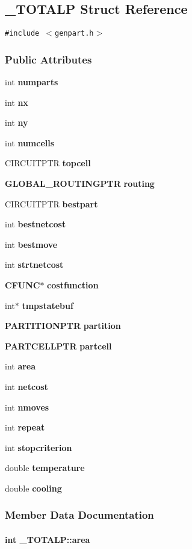 \subsection{\_\-TOTALP  Struct Reference}
\label{_TOTALP}
{\tt \#include $<$genpart.h$>$}

\subsubsection*{Public Attributes}
\begin{CompactItemize}
\item 
int {\bf numparts}
\item 
int {\bf nx}
\item 
int {\bf ny}
\item 
int {\bf numcells}
\item 
CIRCUITPTR {\bf topcell}
\item 
{\bf GLOBAL\_\-ROUTINGPTR} {\bf routing}
\item 
CIRCUITPTR {\bf bestpart}
\item 
int {\bf bestnetcost}
\item 
int {\bf bestmove}
\item 
int {\bf strtnetcost}
\item 
{\bf CFUNC}$\ast$ {\bf costfunction}
\item 
int$\ast$ {\bf tmpstatebuf}
\item 
{\bf PARTITIONPTR} {\bf partition}
\item 
{\bf PARTCELLPTR} {\bf partcell}
\item 
int {\bf area}
\item 
int {\bf netcost}
\item 
int {\bf nmoves}
\item 
int {\bf repeat}
\item 
int {\bf stopcriterion}
\item 
double {\bf temperature}
\item 
double {\bf cooling}
\end{CompactItemize}


\subsubsection{Member Data Documentation}
\label{_TOTALP_m14}
\paragraph{\setlength{\rightskip}{0pt plus 5cm}int \_\-TOTALP::area}\hfill




